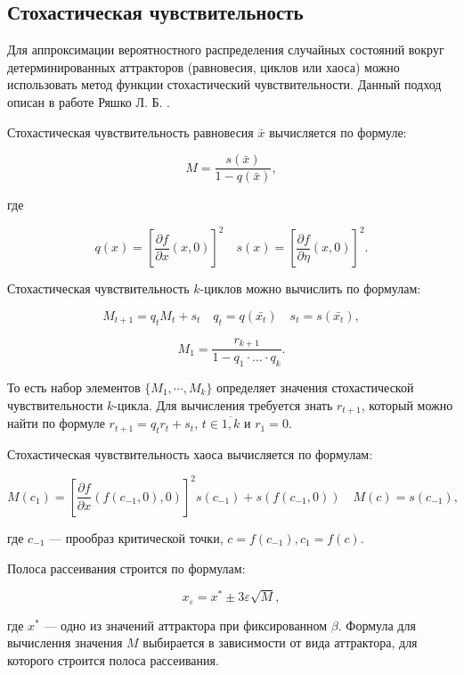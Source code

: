 \subsection{Стохастическая чувствительность}

    Для аппроксимации вероятностного распределения случайных состояний вокруг детерминированных аттракторов (равновесия, циклов или хаоса) можно использовать метод функции стохастический чувствительности. Данный подход описан в работе Ряшко Л. Б. \cite{Ryashko}.

    Стохастическая чувствительность равновесия \(\bar{x}\) вычисляется по формуле:

    \[
        M = \frac{s(\bar{x})}{1 - q(\bar{x})},
    \]

    где 

    \[
        q(x) = \left[\frac{\partial f}{\partial x}(x, 0)\right]^2 \quad s(x) = \left[\frac{\partial f}{\partial \eta}(x, 0)\right]^2.
    \]

    Стохастическая чувствительность \(k\)-циклов можно вычислить по формулам:

    \[
        M_{t + 1} = q_t M_t + s_t \quad q_t = q(\bar{x_t}) \quad s_t = s(\bar{x_t}),
    \]

    \[
        M_1 = \frac{r_{k + 1}}{1 - q_1 \cdot \ldots \cdot q_k}.
    \]

    То есть набор элементов \(\{M_1, \cdots, M_k\}\) определяет значения стохастической чувствительности \(k\)-цикла. Для вычисления требуется знать \(r_{t + 1}\), который можно найти по формуле \(r_{t + 1} = q_t r_t + s_t\), \(t \in \overline{1, k}\) и \(r_1 = 0\).

    Стохастическая чувствительность хаоса вычисляется по формулам:

    \[
        M(c_1) = \left[\frac{\partial f}{\partial x}(f(c_{-1}, 0), 0)\right]^2 s(c_{-1}) + s(f(c_{-1}, 0)) \quad M(c) = s(c_{-1}),
    \]

    где \(c_{-1}\) --- прообраз критической точки, \(c = f(c_{-1}), c_1 = f(c)\).

    Полоса рассеивания строится по формулам: 

    \begin{equation}
        \label{scattering_band}
        x_\varepsilon = x^* \pm 3\varepsilon \sqrt{M},    
    \end{equation}

    где \(x^*\) --- одно из значений аттрактора при фиксированном \(\beta\). Формула для вычисления значения \(M\) выбирается в зависимости от вида аттрактора, для которого строится полоса рассеивания.

